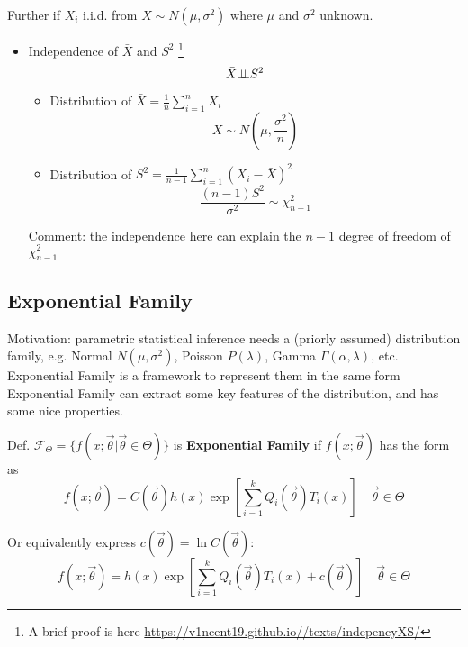    Further if $X_i$ i.i.d. from $X\sim N(\mu,\sigma^2)$ where $\mu$ and $\sigma^2$ unknown.
    \begin{itemize}
        \item Independence of $\bar{X}$ and $S^2$ \footnote{A brief proof is here \url{https://v1ncent19.github.io//texts/indepencyXS/}}
            \begin{equation}
            \bar{X}\bot\!\!\!\bot S^2
            \end{equation}
        \begin{itemize}[topsep=6pt,itemsep=4pt]
        \item Distribution of $\bar{X}={\displaystyle\frac{1}{n}\sum_{i=1}^n X_i}$
        \begin{equation}\bar{X}\sim N(\mu,\frac{\sigma^2}{n})\end{equation}
        \item Distribution of $S^2={\displaystyle\frac{1}{n-1}\sum_{i=1}^n(X_i-\bar{X})^2}$
        \begin{equation}\frac{(n-1)S^2}{\sigma^2}\sim\chi^2_{n-1}\end{equation}
        \end{itemize}     
        Comment: the independence here can explain the $ n-1 $ degree of freedom of $ \chi^2_{n-1} $   
    \end{itemize}

\subsection{Exponential Family}\label{SubSectionExponentialFamily}

Motivation: parametric statistical inference needs a (priorly assumed) distribution family, e.g. Normal $ N(\mu ,\sigma ^2) $, Poisson $ P(\lambda ) $, Gamma $ \Gamma (\alpha ,\lambda ) $, etc. Exponential Family is a framework to represent them in the same form Exponential Family can extract some key features of the distribution, and has some nice properties.

Def. $\mathscr{F}_\Theta=\{f(x;\vec{\theta}|\vec{\theta}\in\Theta)\}$ is \textbf{Exponential Family} if $f(x;\vec{\theta})$ has the form as
\begin{equation}
    f(x;\vec{\theta})=C(\vec{\theta})h(x)\exp \left[  \sum_{i=1}^k Q_i(\vec{\theta})T_i(x) \right]\quad\vec{\theta}\in\Theta
\end{equation}    

    Or equivalently express $ c(\vec{\theta })=\ln C(\vec{\theta }) $:
\begin{equation}
    f(x;\vec{\theta})=h(x)\exp \left[  \sum_{i=1}^k Q_i(\vec{\theta})T_i(x) +c(\vec{\theta }) \right]\quad\vec{\theta}\in\Theta
\end{equation}   

